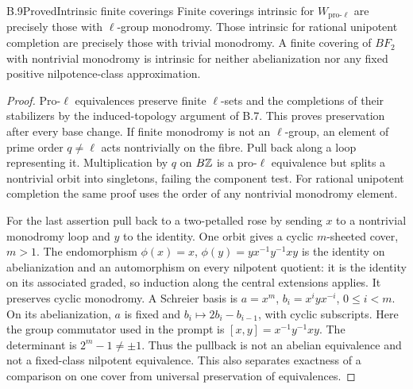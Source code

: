 \begin{statement}{B.9}{Proved}{Intrinsic finite coverings}
Finite coverings intrinsic for $W_{\mathrm{pro}\text{-}\ell}$
are precisely those with $\ell$-group monodromy. Those intrinsic
for rational unipotent completion are precisely those with
trivial monodromy. A finite covering of $BF_2$ with nontrivial
monodromy is intrinsic for neither abelianization nor any fixed
positive nilpotence-class approximation.
\end{statement}
\begin{proof}
Pro-$\ell$ equivalences preserve finite $\ell$-sets and the
completions of their stabilizers by the induced-topology
argument of B.7. This proves preservation after every base
change. If finite monodromy is not an $\ell$-group, an element
of prime order $q\ne\ell$ acts nontrivially on the fibre.
Pull back along a loop representing it. Multiplication by $q$
on $B\mathbb Z$ is a pro-$\ell$ equivalence but splits a nontrivial
orbit into singletons, failing the component test. For rational
unipotent completion the same proof uses the order of any
nontrivial monodromy element.

For the last assertion pull back to a two-petalled rose by
sending $x$ to a nontrivial monodromy loop and $y$ to the
identity. One orbit gives a cyclic $m$-sheeted cover, $m>1$.
The endomorphism $\phi(x)=x$, $\phi(y)=yx^{-1}y^{-1}xy$ is the
identity on abelianization and an automorphism on every
nilpotent quotient: it is the identity on its associated
graded, so induction along the central extensions applies.
It preserves cyclic monodromy. A Schreier basis is
$a=x^m$, $b_i=x^iyx^{-i}$, $0\le i<m$. On its abelianization,
$a$ is fixed and $b_i\mapsto2b_i-b_{i-1}$, with cyclic
subscripts. Here the group commutator used in the prompt is $[x,y]=x^{-1}y^{-1}xy$.
The determinant is $2^m-1\ne\pm1$. Thus the pullback is
not an abelian equivalence and not a fixed-class nilpotent
equivalence. This also separates exactness of a comparison on
one cover from universal preservation of equivalences.
\end{proof}

